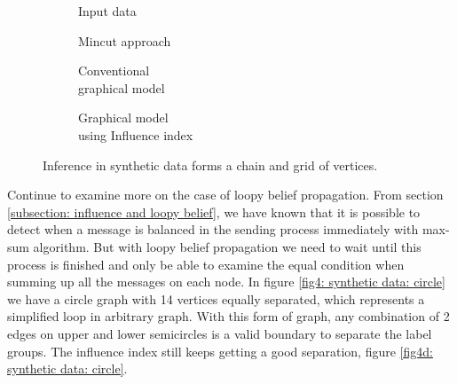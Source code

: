 \begin{figure}[t!]
	\centering
	\captionsetup[subfigure]{justification=centering}
	\begin{subfigure}[b]{0.45\textwidth}
		\centering
		
		\caption{Input data}
		\label{fig4a: synthetic data: chain and grid}
	\end{subfigure}
	\hfill
	\begin{subfigure}[b]{0.45\textwidth}
		\centering
		
		\caption{Mincut approach}
		\label{fig4b: synthetic data: chain and grid}
	\end{subfigure}

	\hfill
	
	\begin{subfigure}[b]{0.45\textwidth}
		\centering
		
		\caption{Conventional \\ graphical model}
		\label{fig4c: synthetic data: chain and grid}
	\end{subfigure}
	\hfill
	\begin{subfigure}[b]{0.45\textwidth}
		\centering
		
		\caption{Graphical model \\ using Influence index}
		\label{fig4d: synthetic data: chain and grid}
	\end{subfigure}

	\caption{Inference in synthetic data forms a chain and grid of vertices.}
	\label{fig4: synthetic data: chain and grid}
\end{figure}

Continue to examine more on the case of loopy belief propagation. From section \ref{subsection: influence and loopy belief}, we have known that it is possible to detect when a message is balanced in the sending process immediately with max-sum algorithm. But with loopy belief propagation we need to wait until this process is finished and only be able to examine the equal condition when summing up all the messages on each node. In figure \ref{fig4: synthetic data: circle} we have a circle graph with 14 vertices equally separated, which represents a simplified loop in arbitrary graph. With this form of graph, any combination of 2 edges on upper and lower semicircles is a valid boundary to separate the label groups. The influence index still keeps getting a good separation, figure \ref{fig4d: synthetic data: circle}. 

